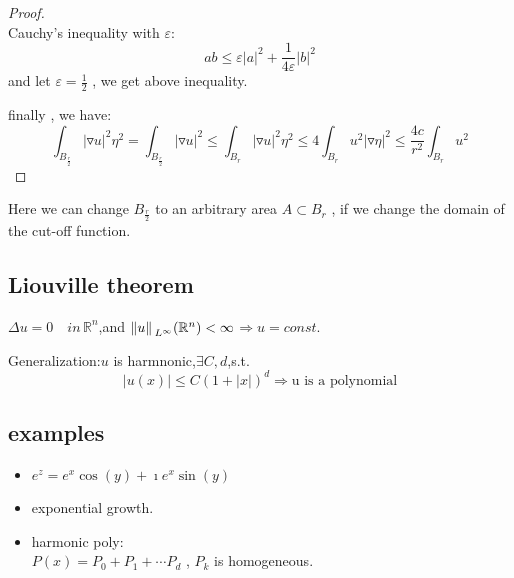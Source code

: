 \begin{proof}
\begin{equation*}
    \end{equation*}
    Cauchy's inequality with $\varepsilon$:
    \begin{equation*}
        ab\leq \varepsilon |a|^2+\frac{1}{4\varepsilon}|b|^2
    \end{equation*}
    and let $\varepsilon=\frac{1}{2}$ , we get above inequality.\par
    finally , we have:
    \begin{equation*}
        \int_{B_{\frac{r}{2}}}|\triangledown u|^2\eta^2=\int_{B_{\frac{r}{2}}}|\triangledown u|^2\leq \int_{B_r}|\triangledown u|^2 \eta^2\leq 4\int_{B_r}u^2|\triangledown \eta|^2\leq \frac{4c}{r^2}\int_{B_r}u^2
    \end{equation*} 
\end{proof}

\begin{remark}
    Here we can change $B_{\frac{r}{2}}$ to an arbitrary area $A\subset B_r$ , if we change the domain of the cut-off function.
\end{remark}

\subsection{Liouville theorem}

$\Delta u =0 \quad in\, \mathbb{R}^n$,and $\norm*{u}_{L^{\infty}}(\mathbb{R}^n)<\infty$$\Rightarrow u = const $.

Generalization:$u$ is harmnonic,$\exists C,d$,s.t.
\begin{equation*}
    |u(x)|\leq C(1+|x|)^d\Rightarrow \text{u is a polynomial}
\end{equation*}

\subsection{examples}

\begin{itemize}
    \item $e^z=e^x\cos(y)+\imath e^x\sin(y)$
    \item exponential growth.
    \item harmonic poly:\\
    $P(x)=P_0+P_1+\cdots P_d$ , $P_k$ is homogeneous.
\end{itemize}